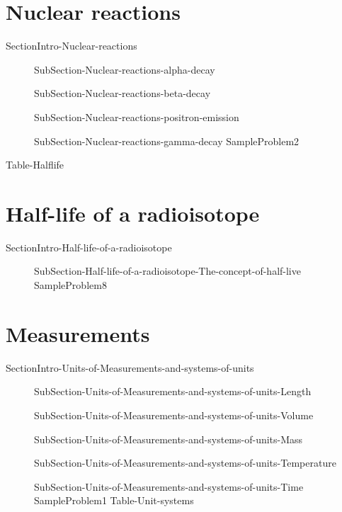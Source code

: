 \documentclass[main.tex]{subfiles}
\begin{document}
\section{\faFlash Nuclear reactions}
{SectionIntro-Nuclear-reactions}
\sloppy \begin{description}
\item[] 
{SubSection-Nuclear-reactions-alpha-decay}
\item[] 
{SubSection-Nuclear-reactions-beta-decay}
\item[] 
{SubSection-Nuclear-reactions-positron-emission}
\item[] 
{SubSection-Nuclear-reactions-gamma-decay}
  {SampleProblem2}
\end{description}
 
{Table-Halflife}
\section{\faFlash Half-life of a radioisotope}
{SectionIntro-Half-life-of-a-radioisotope}
\sloppy \begin{description}
\item[]
{SubSection-Half-life-of-a-radioisotope-The-concept-of-half-live}
  {SampleProblem8}

\end{description}


\section{\faGears Measurements}
{SectionIntro-Units-of-Measurements-and-systems-of-units}
\sloppy\begin{description}
\item[]{SubSection-Units-of-Measurements-and-systems-of-units-Length}
\item[]{SubSection-Units-of-Measurements-and-systems-of-units-Volume}
\item[]{SubSection-Units-of-Measurements-and-systems-of-units-Mass}
\item[]{SubSection-Units-of-Measurements-and-systems-of-units-Temperature}
\item[]{SubSection-Units-of-Measurements-and-systems-of-units-Time}
{SampleProblem1}
{Table-Unit-systems}
\end{description}
\end{document}
